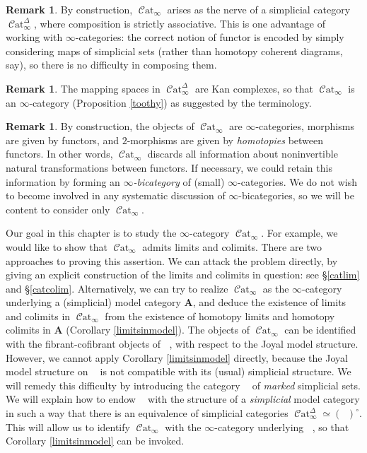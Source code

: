 \documentclass{report}[10pt, final]
\newcommand{\bfA}{{\mathbf A}}
\newcommand{\degree}{\circ}
\DeclareMathOperator{\sSet}{\mathcal{S}et_{\Delta}}
\DeclareMathOperator{\mSet}{\mathcal{S}et_{\Delta}^{+}}
\DeclareMathOperator{\Cat}{\mathcal{C}at}
\theoremstyle{definition}
\newtheorem{remark}[theorem]{Remark}
\begin{document}
\begin{remark}
By construction, $\Cat_{\infty}$ arises as the nerve of a simplicial category
$\Cat_{\infty}^{\Delta}$, where composition is strictly associative. This is one advantage
of working with $\infty$-categories: the correct notion of functor is encoded by simply considering maps of simplicial sets (rather than homotopy coherent diagrams, say), so there is no difficulty in composing them.
\end{remark}

\begin{remark}
The mapping spaces in $\Cat^{\Delta}_{\infty}$ are Kan complexes, so that
$\Cat_{\infty}$ is an $\infty$-category (Proposition \ref{toothy}) as suggested by the terminology.
\end{remark}

\begin{remark}
By construction, the objects of $\Cat_{\infty}$ are $\infty$-categories, morphisms are given by functors, and $2$-morphisms are given by {\em homotopies} between functors. In other words, $\Cat_{\infty}$ discards all information about noninvertible natural transformations between functors. If necessary, we could retain this information by forming an {\it $\infty$-bicategory} of (small) $\infty$-categories. We do not wish to become involved in any systematic discussion of $\infty$-bicategories, so we will be content to consider only $\Cat_{\infty}$.
\end{remark}

Our goal in this chapter is to study the $\infty$-category $\Cat_{\infty}$. For example, we would like to show that $\Cat_{\infty}$ admits limits and colimits. There are two approaches to proving this assertion. We can attack the problem directly, by giving an explicit construction of the limits and colimits in question: see \S \ref{catlim} and \S \ref{catcolim}. Alternatively, we can try to
realize $\Cat_{\infty}$ as the $\infty$-category underlying a (simplicial) model category $\bfA$, and deduce the existence of limits and colimits in $\Cat_{\infty}$ from the existence of homotopy limits and homotopy colimits in $\bfA$ (Corollary \ref{limitsinmodel}). The objects of $\Cat_{\infty}$ can be identified with the fibrant-cofibrant objects of $\sSet$, with respect to the Joyal model structure. However, we cannot apply Corollary \ref{limitsinmodel} directly, because the Joyal model structure on $\sSet$ is not compatible with its (usual) simplicial structure. We will remedy this difficulty by introducing the category $\mSet$ of {\em marked} simplicial sets. We will explain how to endow $\mSet$ with the structure of a {\em simplicial} model category in such a way that there is an equivalence of simplicial categories $\Cat^{\Delta}_{\infty} \simeq (\mSet)^{\degree}$. This will allow us to identify $\Cat_{\infty}$ with the $\infty$-category underlying $\mSet$, so that Corollary \ref{limitsinmodel} can be invoked.
\end{document}
